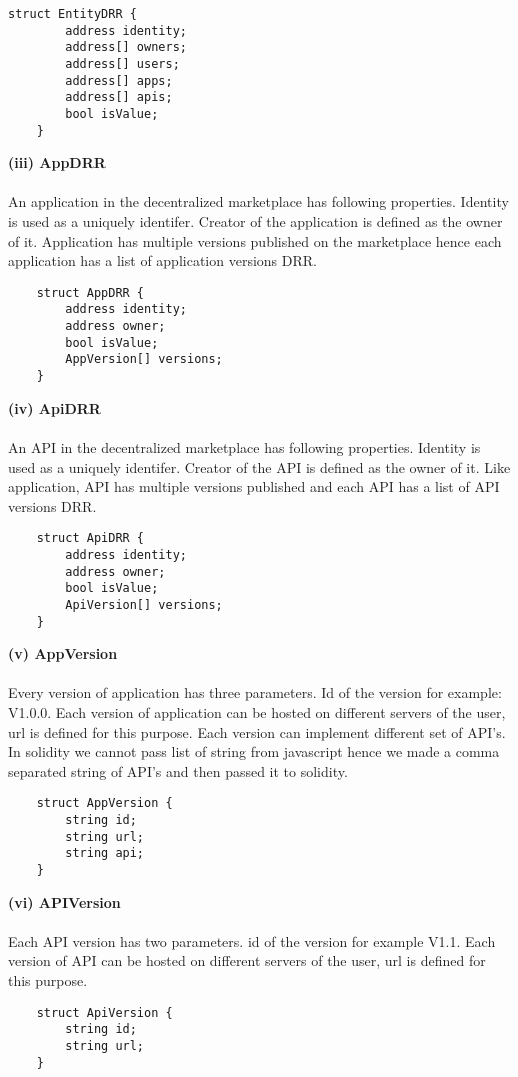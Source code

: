 \begin{lstlisting}
struct EntityDRR {
        address identity;
        address[] owners;
        address[] users;
        address[] apps;
        address[] apis;
        bool isValue;   
    }
    \end{lstlisting}
    \textbf{(iii) AppDRR}
\\
\\
An application in the decentralized marketplace has following properties. Identity is used as a uniquely identifer. Creator of the application is defined as the owner of it. Application has multiple versions published on the marketplace hence each application has a list of application versions DRR.

 \begin{lstlisting}
    struct AppDRR {
        address identity;
        address owner;
        bool isValue;
        AppVersion[] versions;
    }
    \end{lstlisting}
    \textbf{(iv) ApiDRR}
\\
\\
An API in the decentralized marketplace has following properties. Identity is used as a uniquely identifer. Creator of the API is defined as the owner of it. Like application, API has multiple versions published and each API has a list of API versions DRR.

\begin{lstlisting}    
    struct ApiDRR {
        address identity;
        address owner;
        bool isValue;
        ApiVersion[] versions;
    }
\end{lstlisting}

\textbf{(v) AppVersion}
\\
\\
Every version of application has three parameters. Id of the version for example: V1.0.0. Each version of application can be hosted on different servers of the user, url is defined for this purpose. Each version can implement different set of API's. In solidity we cannot pass list of string from javascript hence we made a comma separated string of API's and then passed it to solidity.
\begin{lstlisting}    
    struct AppVersion {
        string id;
        string url;
        string api;
    }
\end{lstlisting}

\textbf{(vi) APIVersion}
\\
\\
Each API version has two parameters. id of the version for example V1.1. Each version of API  can be hosted on different servers of the user, url is defined for this purpose.
\begin{lstlisting}    
    struct ApiVersion {
        string id;
        string url;
    }
\end{lstlisting}

